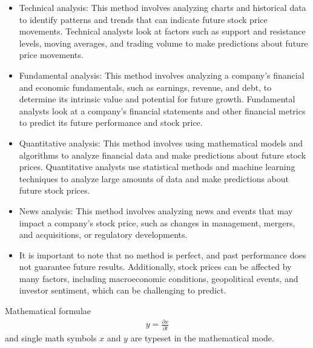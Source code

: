 \begin{itemize}
    \item Technical analysis: This method involves analyzing charts and historical data to identify patterns and trends that can indicate future stock price movements. Technical analysts look at factors such as support and resistance levels, moving averages, and trading volume to make predictions about future price movements.
    \item Fundamental analysis: This method involves analyzing a company's financial and economic fundamentals, such as earnings, revenue, and debt, to determine its intrinsic value and potential for future growth. Fundamental analysts look at a company's financial statements and other financial metrics to predict its future performance and stock price.
    \item Quantitative analysis: This method involves using mathematical models and algorithms to analyze financial data and make predictions about future stock prices. Quantitative analysts use statistical methods and machine learning techniques to analyze large amounts of data and make predictions about future stock prices.
    \item News analysis: This method involves analyzing news and events that may impact a company's stock price, such as changes in management, mergers, and acquisitions, or regulatory developments.
    \item It is important to note that no method is perfect, and past performance does not guarantee future results. Additionally, stock prices can be affected by many factors, including macroeconomic conditions, geopolitical events, and investor sentiment, which can be challenging to predict.
\end{itemize} 

Mathematical formulae  
\begin{align}
y = \frac{\partial x}{\partial t}
\end{align}
and single math symbols $x$ and $y$ are typeset in the mathematical mode.

